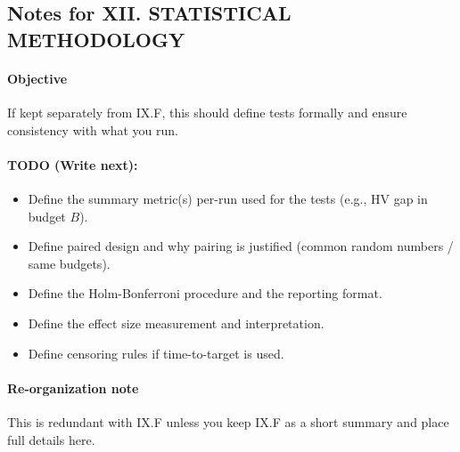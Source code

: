 \subsection*{Notes for XII. STATISTICAL METHODOLOGY}
\paragraph{Objective}
If kept separately from IX.F, this should define tests formally and ensure consistency with what you run.

\paragraph{TODO (Write next):}
\begin{itemize}
  \item Define the summary metric(s) per-run used for the tests (e.g., HV gap in budget $B$).
  \item Define paired design and why pairing is justified (common random numbers / same budgets).
  \item Define the Holm-Bonferroni procedure and the reporting format.
  \item Define the effect size measurement and interpretation.
  \item Define censoring rules if time-to-target is used.
\end{itemize}

\paragraph{Re-organization note}
This is redundant with IX.F unless you keep IX.F as a short summary and place full details here.

